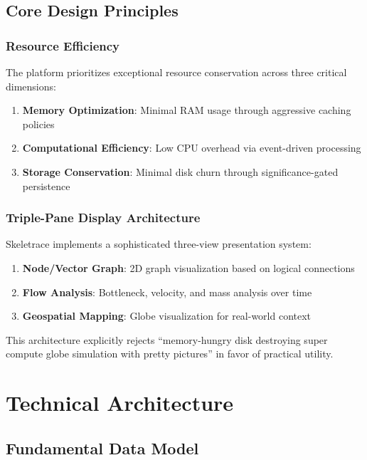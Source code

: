 \documentclass[12pt,a4paper]{article}
\begin{document}
\subsection{Core Design Principles}

\subsubsection{Resource Efficiency}
The platform prioritizes exceptional resource conservation across three critical dimensions:

\begin{enumerate}
\item \textbf{Memory Optimization}: Minimal RAM usage through aggressive caching policies
\item \textbf{Computational Efficiency}: Low CPU overhead via event-driven processing
\item \textbf{Storage Conservation}: Minimal disk churn through significance-gated persistence
\end{enumerate}

\subsubsection{Triple-Pane Display Architecture}
Skeletrace implements a sophisticated three-view presentation system:

\begin{enumerate}
\item \textbf{Node/Vector Graph}: 2D graph visualization based on logical connections
\item \textbf{Flow Analysis}: Bottleneck, velocity, and mass analysis over time
\item \textbf{Geospatial Mapping}: Globe visualization for real-world context
\end{enumerate}

This architecture explicitly rejects ``memory-hungry disk destroying super compute globe simulation with pretty pictures'' in favor of practical utility.

\section{Technical Architecture}

\subsection{Fundamental Data Model}
\end{document}
